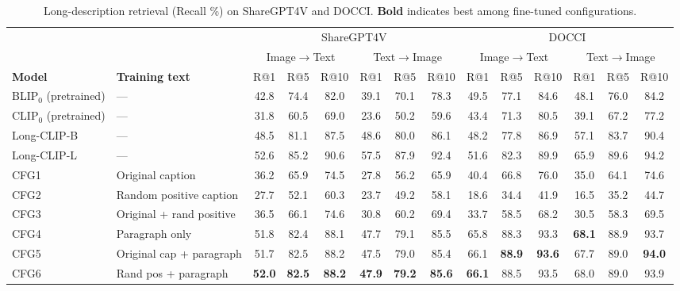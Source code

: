 \documentclass{article}
\begin{document}
\begin{table}[t]
\centering
\caption{Long-description retrieval (Recall \%) on ShareGPT4V and DOCCI. \textbf{Bold} indicates best among fine-tuned configurations.}
\label{tab:long_description}
\small
\setlength{\tabcolsep}{3.5pt}
\begin{adjustbox}{max width=\textwidth}
\begin{tabular}{llcccccccccccc}
\toprule
 &  & \multicolumn{6}{c}{ShareGPT4V} & \multicolumn{6}{c}{DOCCI} \\
\cmidrule(lr){3-8}
\cmidrule(lr){9-14}
 &  & \multicolumn{3}{c}{Image$\to$Text} & \multicolumn{3}{c}{Text$\to$Image} & \multicolumn{3}{c}{Image$\to$Text} & \multicolumn{3}{c}{Text$\to$Image} \\
\cmidrule(lr){3-5}
\cmidrule(lr){6-8}
\cmidrule(lr){9-11}
\cmidrule(lr){12-14}
\textbf{Model} & \textbf{Training text} & R@1 & R@5 & R@10 & R@1 & R@5 & R@10 & R@1 & R@5 & R@10 & R@1 & R@5 & R@10 \\
\midrule
BLIP$_0$ (pretrained) & --- & 42.8 & 74.4 & 82.0 & 39.1 & 70.1 & 78.3 & 49.5 & 77.1 & 84.6 & 48.1 & 76.0 & 84.2 \\
CLIP$_0$ (pretrained) & --- & 31.8 & 60.5 & 69.0 & 23.6 & 50.2 & 59.6 & 43.4 & 71.3 & 80.5 & 39.1 & 67.2 & 77.2 \\
Long-CLIP-B & --- & 48.5 & 81.1 & 87.5 & 48.6 & 80.0 & 86.1 & 48.2 & 77.8 & 86.9 & 57.1 & 83.7 & 90.4 \\
Long-CLIP-L & --- & 52.6 & 85.2 & 90.6 & 57.5 & 87.9 & 92.4 & 51.6 & 82.3 & 89.9 & 65.9 & 89.6 & 94.2 \\
\midrule
CFG1 & Original caption & 36.2 & 65.9 & 74.5 & 27.8 & 56.2 & 65.9 & 40.4 & 66.8 & 76.0 & 35.0 & 64.1 & 74.6 \\
CFG2 & Random positive caption & 27.7 & 52.1 & 60.3 & 23.7 & 49.2 & 58.1 & 18.6 & 34.4 & 41.9 & 16.5 & 35.2 & 44.7 \\
CFG3 & Original + rand positive & 36.5 & 66.1 & 74.6 & 30.8 & 60.2 & 69.4 & 33.7 & 58.5 & 68.2 & 30.5 & 58.3 & 69.5 \\
CFG4 & Paragraph only & 51.8 & 82.4 & 88.1 & 47.7 & 79.1 & 85.5 & 65.8 & 88.3 & 93.3 & \textbf{68.1} & 88.9 & 93.7 \\
CFG5 & Original cap + paragraph & 51.7 & 82.5 & 88.2 & 47.5 & 79.0 & 85.4 & 66.1 & \textbf{88.9} & \textbf{93.6} & 67.7 & 89.0 & \textbf{94.0} \\
CFG6 & Rand pos + paragraph & \textbf{52.0} & \textbf{82.5} & \textbf{88.2} & \textbf{47.9} & \textbf{79.2} & \textbf{85.6} & \textbf{66.1} & 88.5 & 93.5 & 68.0 & 89.0 & 93.9 \\

\end{tabular}
\end{adjustbox}
\end{table}
\end{document}
